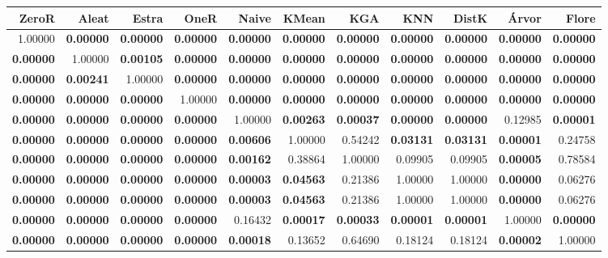\begin{table}
\centering
\label{Breast_Cancerteste_pareado_table}
\begin{tabular}{rrrrrrrrrrr}
\toprule
           ZeroR &            Aleat &            Estra &            OneR  &            Naive &            KMean &              KGA &              KNN &            DistK &            Árvor &            Flore \\
\midrule
         1.00000 & \textbf{0.00000} & \textbf{0.00000} & \textbf{0.00000} & \textbf{0.00000} & \textbf{0.00000} & \textbf{0.00000} & \textbf{0.00000} & \textbf{0.00000} & \textbf{0.00000} & \textbf{0.00000} \\
\textbf{0.00000} &          1.00000 & \textbf{0.00105} & \textbf{0.00000} & \textbf{0.00000} & \textbf{0.00000} & \textbf{0.00000} & \textbf{0.00000} & \textbf{0.00000} & \textbf{0.00000} & \textbf{0.00000} \\
\textbf{0.00000} & \textbf{0.00241} &          1.00000 & \textbf{0.00000} & \textbf{0.00000} & \textbf{0.00000} & \textbf{0.00000} & \textbf{0.00000} & \textbf{0.00000} & \textbf{0.00000} & \textbf{0.00000} \\
\textbf{0.00000} & \textbf{0.00000} & \textbf{0.00000} &          1.00000 & \textbf{0.00000} & \textbf{0.00000} & \textbf{0.00000} & \textbf{0.00000} & \textbf{0.00000} & \textbf{0.00000} & \textbf{0.00000} \\
\textbf{0.00000} & \textbf{0.00000} & \textbf{0.00000} & \textbf{0.00000} &          1.00000 & \textbf{0.00263} & \textbf{0.00037} & \textbf{0.00000} & \textbf{0.00000} &          0.12985 & \textbf{0.00001} \\
\textbf{0.00000} & \textbf{0.00000} & \textbf{0.00000} & \textbf{0.00000} & \textbf{0.00606} &          1.00000 &          0.54242 & \textbf{0.03131} & \textbf{0.03131} & \textbf{0.00001} &          0.24758 \\
\textbf{0.00000} & \textbf{0.00000} & \textbf{0.00000} & \textbf{0.00000} & \textbf{0.00162} &          0.38864 &          1.00000 &          0.09905 &          0.09905 & \textbf{0.00005} &          0.78584 \\
\textbf{0.00000} & \textbf{0.00000} & \textbf{0.00000} & \textbf{0.00000} & \textbf{0.00003} & \textbf{0.04563} &          0.21386 &          1.00000 &          1.00000 & \textbf{0.00000} &          0.06276 \\
\textbf{0.00000} & \textbf{0.00000} & \textbf{0.00000} & \textbf{0.00000} & \textbf{0.00003} & \textbf{0.04563} &          0.21386 &          1.00000 &          1.00000 & \textbf{0.00000} &          0.06276 \\
\textbf{0.00000} & \textbf{0.00000} & \textbf{0.00000} & \textbf{0.00000} &          0.16432 & \textbf{0.00017} & \textbf{0.00033} & \textbf{0.00001} & \textbf{0.00001} &          1.00000 & \textbf{0.00000} \\
\textbf{0.00000} & \textbf{0.00000} & \textbf{0.00000} & \textbf{0.00000} & \textbf{0.00018} &          0.13652 &          0.64690 &          0.18124 &          0.18124 & \textbf{0.00002} &          1.00000 \\
\bottomrule
\end{tabular}
\end{table}
